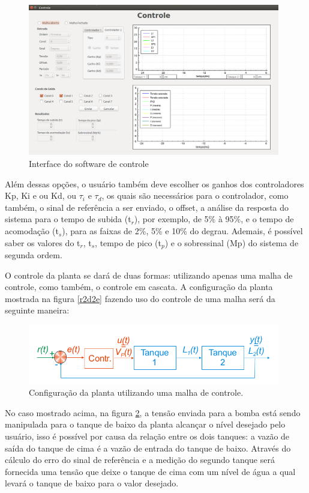 \documentclass[a4paper,12pt]{article}
\begin{document}
\begin{figure}[H]
\centering
\includegraphics[width=11cm]{ImagensLab4/interface-versao4.png}
\caption{Interface do software de controle}
\label{interface}
\end{figure}

\hspace{4ex}Além dessas opções, o usuário também deve escolher os ganhos dos controladores Kp, Ki e ou Kd, ou $\tau_i$ e $\tau_d$, os quais são necessários para o controlador, como também, o  sinal de referência a ser enviado, o offset, a análise da resposta do sistema para o tempo de subida (t$_r$), por exemplo, de 5\% à 95\%, e o tempo de acomodação (t$_s$), para as faixas de 2\%, 5\% e 10\% do degrau. Ademais, é possível saber os valores do  t$_r$, t$_s$, tempo de pico (t$_p$) e o sobressinal (Mp) do sistema de segunda ordem.

\hspace{4ex}O controle da planta se dará de duas formas: utilizando apenas uma malha de controle, como também, o controle em cascata. A configuração da planta mostrada na figura \ref{r2d2e} fazendo uso do controle de uma malha será da seguinte maneira:

\begin{figure}[H]
\centering
\includegraphics[width=11cm]{ImagensLab4/umamalha.png}
\caption{Configuração da planta utilizando uma malha de controle.}
\label{umamalha}
\end{figure}

\hspace{4ex}No caso mostrado acima, na figura \ref{umamalha}, a tensão enviada para a bomba está sendo manipulada para o tanque de baixo da planta alcançar o nível desejado pelo usuário, isso é possível por causa da relação entre os dois tanques: a vazão de saída do tanque de cima é a vazão de entrada do tanque de baixo. Através do cálculo do erro do sinal de referência e a medição do segundo tanque será fornecida uma tensão que deixe o tanque de cima com um nível de água a qual levará o tanque de baixo para o valor desejado.
\end{document}
